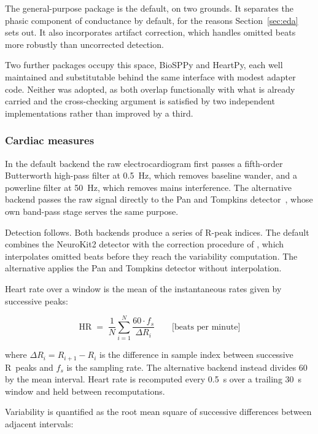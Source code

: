 The general-purpose package is the default, on two grounds. It
separates the phasic component of conductance by default, for the
reasons Section~\ref{sec:eda} sets out. It also incorporates
artifact correction, which handles omitted beats more robustly
than uncorrected detection.

Two further packages occupy this space, BioSPPy and HeartPy, each
well maintained and substitutable behind the same interface with
modest adapter code. Neither was adopted, as both overlap
functionally with what is already carried and the cross-checking
argument is satisfied by two independent implementations rather
than improved by a third.

\subsubsection{Cardiac measures}
\label{sec:hr-hrv}

In the default backend the raw electrocardiogram first passes a
fifth-order Butterworth high-pass filter at 0.5~Hz, which removes
baseline wander, and a powerline filter at 50~Hz, which removes
mains interference. The alternative backend passes the raw signal
directly to the Pan and Tompkins detector~\citep{pantompkins1985},
whose own band-pass stage serves the same purpose.

Detection follows. Both backends produce a series of R-peak
indices. The default combines the NeuroKit2 detector with the
correction procedure of \citet{lipponen2019}, which interpolates
omitted beats before they reach the variability computation. The
alternative applies the Pan and Tompkins detector without
interpolation.

Heart rate over a window is the mean of the instantaneous rates
given by successive peaks:

\begin{equation}
\mathrm{HR} \;=\; \frac{1}{N} \sum_{i=1}^{N}
\frac{60 \cdot f_{s}}{\Delta R_{i}}
\qquad \text{[beats per minute]}
\end{equation}

where $\Delta R_{i} = R_{i+1} - R_{i}$ is the difference in
sample index between successive R~peaks and $f_{s}$ is the
sampling rate. The alternative backend instead divides 60 by the
mean interval. Heart rate is recomputed every 0.5~s over a
trailing 30~s window and held between recomputations.

Variability is quantified as the root mean square of successive
differences between adjacent intervals:

